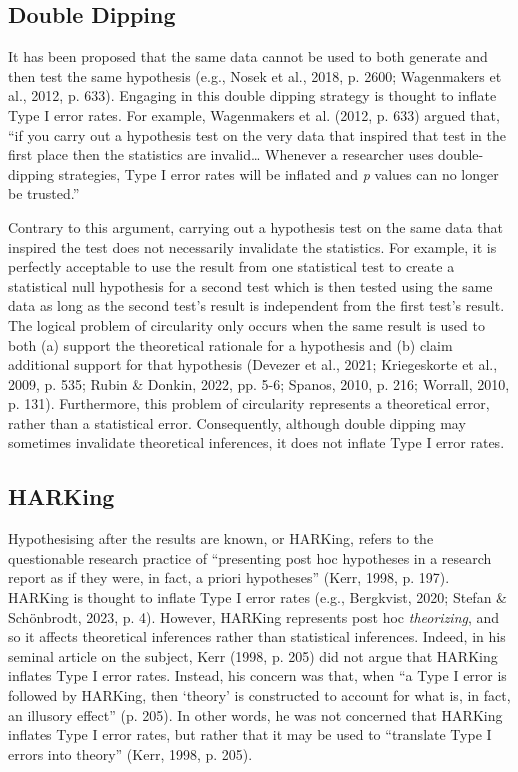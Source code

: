 \documentclass[authordate, meta]{jote-new-article}
\begin{document}
	\subsection{Double Dipping}



	It has been proposed that the same data cannot be used to both generate and then test the same hypothesis (e.g., Nosek et al., 2018, p. 2600; Wagenmakers et al., 2012, p. 633). Engaging in this double dipping strategy is thought to inflate Type I error rates. For example, Wagenmakers et al. (2012, p. 633) argued that, “if you carry out a hypothesis test on the very data that inspired that test in the first place then the statistics are invalid… Whenever a researcher uses double-dipping strategies, Type I error rates will be inflated and\emph{ p} values can no longer be trusted.”



	Contrary to this argument, carrying out a hypothesis test on the same data that inspired the test does not necessarily invalidate the statistics. For example, it is perfectly acceptable to use the result from one statistical test to create a statistical null hypothesis for a second test which is then tested using the same data as long as the second test's result is independent from the first test's result. The logical problem of circularity only occurs when the same result is used to both (a) support the theoretical rationale for a hypothesis and (b) claim additional support for that hypothesis (Devezer et al., 2021; Kriegeskorte et al., 2009, p. 535; Rubin \& Donkin, 2022, pp. 5-6; Spanos, 2010, p. 216; Worrall, 2010, p. 131). Furthermore, this problem of circularity represents a theoretical error, rather than a statistical error. Consequently, although double dipping may sometimes invalidate theoretical inferences, it does not inflate Type I error rates.



	\subsection{HARKing}



	Hypothesising after the results are known, or HARKing, refers to the questionable research practice of “presenting post hoc hypotheses in a research report as if they were, in fact, a priori hypotheses” (Kerr, 1998, p. 197). HARKing is thought to inflate Type I error rates (e.g., Bergkvist, 2020; Stefan \& Schönbrodt, 2023, p. 4). However, HARKing represents post hoc \emph{theorizing}, and so it affects theoretical inferences rather than statistical inferences. Indeed, in his seminal article on the subject, Kerr (1998, p. 205) did not argue that HARKing inflates Type I error rates. Instead, his concern was that, when “a Type I error is followed by HARKing, then ‘theory' is constructed to account for what is, in fact, an illusory effect” (p. 205). In other words, he was not concerned that HARKing inflates Type I error rates, but rather that it may be used to “translate Type I errors into theory” (Kerr, 1998, p. 205).
\end{document}
